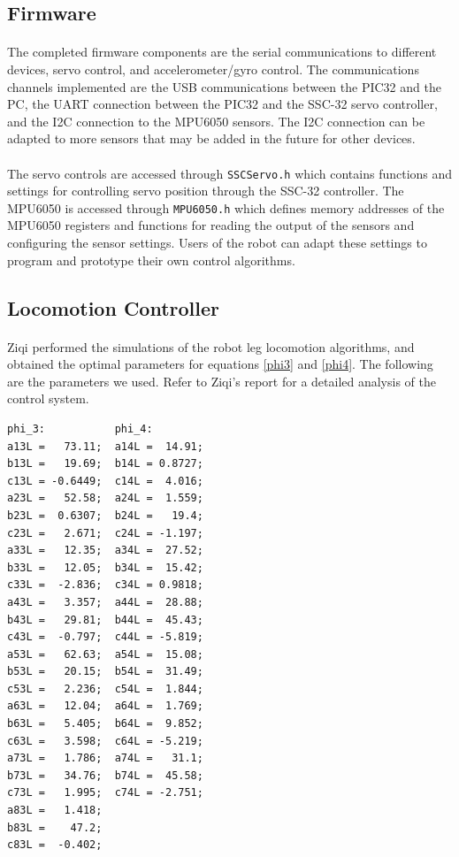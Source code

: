 \documentclass[titlepage,letterpaper,12pt]{article}
\begin{document}
\subsection{Firmware}
\paragraph{}The completed firmware components are the serial
communications to different devices, servo control, and accelerometer/gyro
control.  The communications channels implemented are the USB communications
between the PIC32 and the PC, the UART connection between the PIC32 and the
SSC-32 servo controller, and the I2C connection to the MPU6050 sensors. The I2C
connection can be adapted to more sensors that may be added in the future for
other devices. 

\paragraph{}The servo controls are accessed through \verb!SSCServo.h! which
contains functions and settings for controlling servo position through the
SSC-32 controller. The MPU6050 is accessed through \verb!MPU6050.h! which
defines memory addresses of the MPU6050 registers and functions for reading the
output of the sensors and configuring the sensor settings. Users of the
robot can adapt these settings to program and prototype their own control
algorithms.

\subsection{Locomotion Controller}
\paragraph{}Ziqi performed the simulations of the robot leg locomotion
algorithms, and obtained the optimal parameters for equations \ref{phi3} and
\ref{phi4}. The following are the parameters we used. Refer to Ziqi's report for
a detailed analysis of the control system.
\begin{verbatim}
phi_3:           phi_4:
a13L =   73.11;  a14L =  14.91;
b13L =   19.69;  b14L = 0.8727;
c13L = -0.6449;  c14L =  4.016;
a23L =   52.58;  a24L =  1.559;
b23L =  0.6307;  b24L =   19.4;
c23L =   2.671;  c24L = -1.197;
a33L =   12.35;  a34L =  27.52;
b33L =   12.05;  b34L =  15.42;
c33L =  -2.836;  c34L = 0.9818;
a43L =   3.357;  a44L =  28.88;
b43L =   29.81;  b44L =  45.43;
c43L =  -0.797;  c44L = -5.819;
a53L =   62.63;  a54L =  15.08;
b53L =   20.15;  b54L =  31.49;
c53L =   2.236;  c54L =  1.844;
a63L =   12.04;  a64L =  1.769;
b63L =   5.405;  b64L =  9.852;
c63L =   3.598;  c64L = -5.219;
a73L =   1.786;  a74L =   31.1;
b73L =   34.76;  b74L =  45.58;
c73L =   1.995;  c74L = -2.751;
a83L =   1.418;
b83L =    47.2;
c83L =  -0.402;
\end{verbatim}
\end{document}
